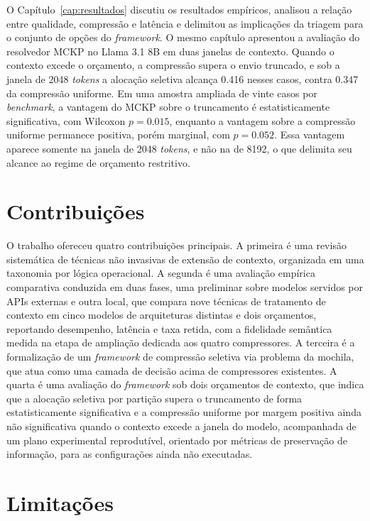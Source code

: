 O Capítulo~\ref{cap:resultados} discutiu os resultados empíricos, analisou a relação entre qualidade, compressão e latência e delimitou as implicações da triagem para o conjunto de opções do \textit{framework}. O mesmo capítulo apresentou a avaliação do resolvedor MCKP no Llama 3.1 8B em duas janelas de contexto. Quando o contexto excede o orçamento, a compressão supera o envio truncado, e sob a janela de 2048 \textit{tokens} a alocação seletiva alcança 0.416 nesses casos, contra 0.347 da compressão uniforme. Em uma amostra ampliada de vinte casos por \textit{benchmark}, a vantagem do MCKP sobre o truncamento é estatisticamente significativa, com Wilcoxon $p = 0.015$, enquanto a vantagem sobre a compressão uniforme permanece positiva, porém marginal, com $p = 0.052$. Essa vantagem aparece somente na janela de 2048 \textit{tokens}, e não na de 8192, o que delimita seu alcance ao regime de orçamento restritivo.

\section{Contribuições}
\label{sec:contribuicoes-conclusao}

O trabalho ofereceu quatro contribuições principais. A primeira é uma revisão sistemática de técnicas não invasivas de extensão de contexto, organizada em uma taxonomia por lógica operacional. A segunda é uma avaliação empírica comparativa conduzida em duas fases, uma preliminar sobre modelos servidos por APIs externas e outra local, que compara nove técnicas de tratamento de contexto em cinco modelos de arquiteturas distintas e dois orçamentos, reportando desempenho, latência e taxa retida, com a fidelidade semântica medida na etapa de ampliação dedicada aos quatro compressores. A terceira é a formalização de um \textit{framework} de compressão seletiva via problema da mochila, que atua como uma camada de decisão acima de compressores existentes. A quarta é uma avaliação do \textit{framework} sob dois orçamentos de contexto, que indica que a alocação seletiva por partição supera o truncamento de forma estatisticamente significativa e a compressão uniforme por margem positiva ainda não significativa quando o contexto excede a janela do modelo, acompanhada de um plano experimental reprodutível, orientado por métricas de preservação de informação, para as configurações ainda não executadas.

\section{Limitações}
\label{sec:limitacoes}

